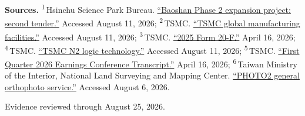\begin{minipage}[t][0.90\textheight][t]{\textwidth}
{\sffamily\scriptsize\setlength{\emergencystretch}{1.5em}\textbf{Sources.} \textsuperscript{1}\,Hsinchu Science Park Bureau. \href{\detokenize{https://pavo.sipa.gov.tw/sppc/bleppage02.html}}{\enquote{Baoshan Phase 2 expansion project: second tender.}} Accessed August 11, 2026; \textsuperscript{2}\,TSMC. \href{\detokenize{https://www.tsmc.com/english/aboutTSMC/TSMC_Fabs}}{\enquote{TSMC global manufacturing facilities.}} Accessed August 11, 2026; \textsuperscript{3}\,TSMC. \href{\detokenize{https://investor.tsmc.com/sites/ir/sec-filings/2025_20F}\%\detokenize{20Report.pdf}}{\enquote{2025 Form 20-F.}} April 16, 2026; \textsuperscript{4}\,TSMC. \href{\detokenize{https://www.tsmc.com/english/dedicatedFoundry/technology/logic/l_2nm}}{\enquote{TSMC N2 logic technology.}} Accessed August 11, 2026; \textsuperscript{5}\,TSMC. \href{\detokenize{https://investor.tsmc.com/chinese/encrypt/files/encrypt_file/reports/2026-04/3cef85204275f94fd111485cfdf4adb3c0263c45/TSMC}\%\detokenize{201Q26}\%\detokenize{20Transcript.pdf}}{\enquote{First Quarter 2026 Earnings Conference Transcript.}} April 16, 2026; \textsuperscript{6}\,Taiwan Ministry of the Interior, National Land Surveying and Mapping Center. \href{\detokenize{https://maps.nlsc.gov.tw/S09SOA/pro/Wms_ajax_list.jsp}}{\enquote{PHOTO2 general orthophoto service.}} Accessed August 6, 2026.\par}
\vfill
\noindent{\color{hairline}\rule{\linewidth}{0.4pt}}\par\smallskip
{\sffamily\scriptsize\color{black!58} Evidence reviewed through August 25, 2026.\par}
\end{minipage}
\clearpage
